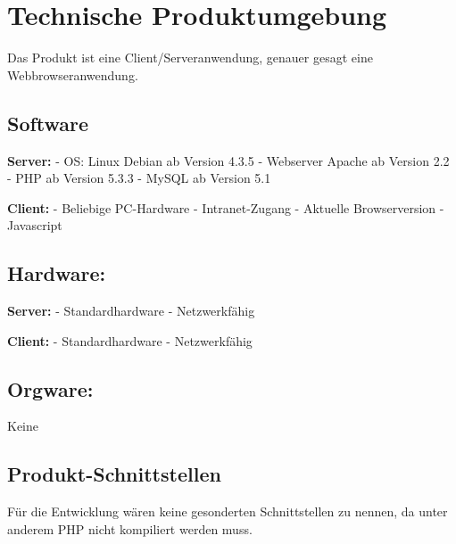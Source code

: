 \section{Technische Produktumgebung}

    Das Produkt ist eine Client/Serveranwendung, genauer gesagt eine Webbrowseranwendung.

    \subsection{Software}

    \textbf{Server:}
    - OS: Linux Debian ab Version 4.3.5
    - Webserver Apache ab Version 2.2
    - PHP ab Version 5.3.3
    - MySQL ab Version 5.1

    \textbf{Client:}
    - Beliebige PC-Hardware
    - Intranet-Zugang
    - Aktuelle Browserversion
    - Javascript

    \subsection{Hardware:}

    \textbf{Server:}
    - Standardhardware
    - Netzwerkfähig

    \textbf{Client:}
    - Standardhardware
    - Netzwerkfähig

    \subsection{Orgware:}
    Keine

    \subsection{Produkt-Schnittstellen}
    Für die Entwicklung wären keine gesonderten Schnittstellen zu nennen, da unter anderem PHP nicht kompiliert werden muss.